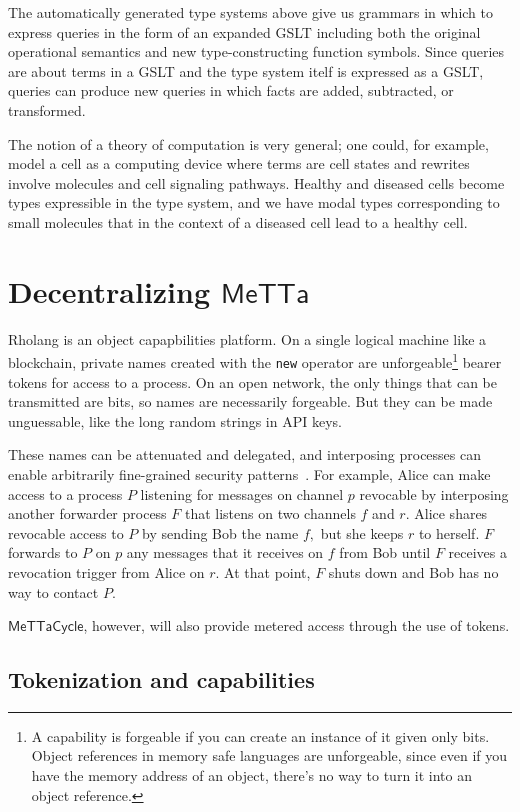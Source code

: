 \documentclass{article}
\newcommand{\MC}{\mathsf{MeTTaCycle}}
\begin{document}
The automatically generated type systems above give us grammars in which to express queries in the form of an expanded GSLT including both the original operational semantics and new type-constructing function symbols. Since queries are about terms in a GSLT and the type system itelf is expressed as a GSLT, queries can produce new queries in which facts are added, subtracted, or transformed.

The notion of a theory of computation is very general; one could, for example, model a cell as a computing device where terms are cell states and rewrites involve molecules and cell signaling pathways.  Healthy and diseased cells become types expressible in the type system, and we have modal types corresponding to small molecules that in the context of a diseased cell lead to a healthy cell.

\section{Decentralizing $\mathsf{MeTTa}$}

Rholang is an object capapbilities platform.  On a single logical machine like a blockchain, private names created with the \verb+new+ operator are unforgeable\footnote{A capability is forgeable if you can create an instance of it given only bits. Object references in memory safe languages are unforgeable, since even if you have the memory address of an object, there's no way to turn it into an object reference.} bearer tokens for access to a process.  On an open network, the only things that can be transmitted are bits, so names are necessarily forgeable.  But they can be made unguessable, like the long random strings in API keys.

These names can be attenuated and delegated, and interposing processes can enable arbitrarily fine-grained security patterns~\cite{Stiegler2004}.  For example, Alice can make access to a process $P$ listening for messages on channel $p$ revocable by interposing another forwarder process $F$ that listens on two channels $f$ and $r$.  Alice shares revocable access to $P$ by sending Bob the name $f,$ but she keeps $r$ to herself.  $F$ forwards to $P$ on $p$ any messages that it receives on $f$ from Bob until $F$ receives a revocation trigger from Alice on $r$.  At that point, $F$ shuts down and Bob has no way to contact $P$.

$\MC$, however, will also provide metered access through the use of tokens.

\subsection{Tokenization and capabilities}
\label{Security model}
\end{document}
